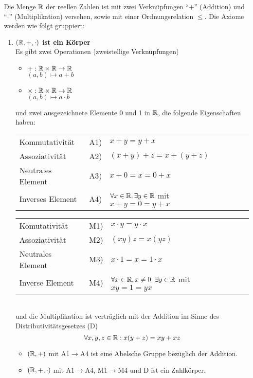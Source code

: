 Die Menge $\mathbb{R}$ der reellen Zahlen ist mit zwei Verknüpfungen ``$+$'' (Addition) und ``$\cdot$'' (Multiplikation) versehen, sowie mit einer Ordnungsrelation $\leq$. Die Axiome werden wie folgt gruppiert:
\begin{enumerate}
\item \textbf{$\left( \mathbb{R},+,\cdot\right)$ ist ein Körper}\\
Es gibt zwei Operationen (zweistellige Verknüpfungen)
\begin{itemize}
\item $+:\mathbb{R}\times\mathbb{R}\to\mathbb{R}$\\
$(a,b)\mapsto a+b$
\item $\times:\mathbb{R}\times\mathbb{R}\to\mathbb{R}$\\
$(a,b)\mapsto a\cdot b$
\end{itemize}

und zwei ausgezeichnete Elemente 0 und 1 in $\mathbb{R}$, die folgende Eigenschaften haben:\\

\begin{tabular}{l r l r l}
Kommutativität & A1) & $x+y=y+x$  \\
Assoziativität & A2) & $(x+y)+z=x+(y+z)$  \\
Neutrales Element & A3) & $x+0=x=0+x$ \\
Inverses Element & A4) & $\forall x\in\mathbb{R}, \exists y\in\mathbb{R}$ mit $x+y=0=y+x$
\end{tabular}

\begin{tabular}{l r l r l}
Komutativität  & M1) & $x\cdot y=y\cdot x$ \\
Assoziativität  & M2) & $(xy)z=x(yz)$ \\
Neutrales Element  & M3) & $x\cdot 1= x =1\cdot x$\\
Inverse Element  & M4) & $\forall x\in\mathbb{R}, x\not =0$  $ \exists y\in\mathbb{R}$ mit $xy=1=yx$
\end{tabular}
\\

und die Multiplikation ist verträglich mit der Addition im Sinne des Distributivitätsgesetzes (D)\[\forall x,y,z\in\mathbb{R}:x(y+z)=xy+xz\]

\begin{itemize}
\item $( \mathbb{R},+)$ mit A1$\to$A4 ist eine Abelsche Gruppe bezüglich der Addition.
\item  $( \mathbb{R},+,\cdot)$ mit A1$\to$A4, M1$\to$M4 und D ist ein Zahlkörper.
\end{itemize}


\end{enumerate}
